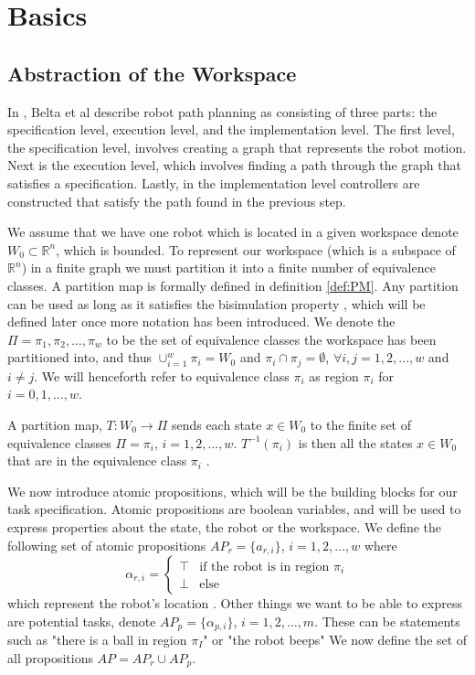 \section{Basics}

\subsection{Abstraction of the Workspace}
In \cite{belta07}, Belta et al describe robot path planning as consisting of three parts: the specification level, execution level, and the implementation level. The first level, the specification level, involves creating a graph that represents the robot motion. Next is the execution level, which involves finding a path through the graph that satisfies a specification. Lastly, in the implementation level controllers are constructed that satisfy the path found in the previous step. 

We assume that we have one robot which is located in a given workspace denote $W_0 \subset \mathbb{R}^n$, which is bounded. To represent our workspace (which is a subspace of $\mathbb{R}^n$) in a finite graph we must partition it into a finite number of equivalence classes. A partition map is formally defined in definition \ref{def:PM}. Any partition can be used as long as it satisfies the bisimulation property \cite{belta04}, which will be defined later once more notation has been introduced. We denote the $\Pi = {\pi_1, \pi_2, \dots, \pi_w}$ to be the set of equivalence classes the workspace has been partitioned into, and thus $\cup_{i=1}^w \pi_i = W_0$ and $\pi_i \cap \pi_j = \emptyset$, $\forall i,j=1,2,\dots,w$ and $i\neq j$. We will henceforth refer to equivalence class $\pi_i$ as region $\pi_i$ for $i = 0,1,\dots, w$. 

\begin{definition}
\label{def:PM}
A partition map, $T: W_0 \rightarrow \Pi$ sends each state $x \in W_0$ to the finite set of equivalence classes $\Pi = {\pi_i}$,  $i = 1,2,\dots ,w$. $T^{-1}(\pi_i)$ is then all the states $x \in W_0$ that are in the equivalence class $\pi_i$ \cite{fainekos05}. 
\end{definition} 

We now introduce atomic propositions, which will be the building blocks for our task specification. Atomic propositions are boolean variables, and will be used to express properties about the state, the robot or the workspace. We define the following set of atomic propositions $AP_r = \{a_{r,i}\}$, $i=1,2,\dots,w$ where 
\[\alpha_{r,i} =  \begin{cases}
\top & \text{if the robot is in region $\pi_i$} \\
\bot & \text{else}
\end{cases}
\]
which represent the robot's location \cite{guo15}. Other things we want to be able to express are potential tasks, denote $AP_p = \{\alpha_{p,i}\}$, $i=1,2,\dots,m$. These can be statements such as "there is a ball in region $\pi_I$" or "the robot beeps"
We now define the set of all propositions $AP = AP_r \cup AP_p$.

